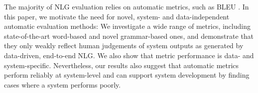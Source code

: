 The majority of NLG evaluation relies on automatic metrics, such as BLEU . In this paper, we motivate the need for novel, system- and data-independent automatic evaluation methods: We investigate a wide range of metrics, including state-of-the-art word-based and novel grammar-based ones, and demonstrate that they only weakly reflect human judgements of system outputs as generated by data-driven, end-to-end NLG. We also show that metric performance is data- and system-specific. Nevertheless, our results also suggest that automatic metrics perform reliably at system-level and can support system development by finding cases where a system performs poorly.
